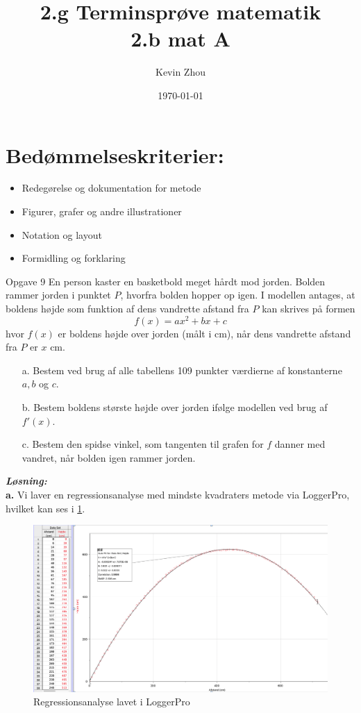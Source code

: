 \documentclass{article}
\title{2.g Terminsprøve matematik\\
{\Large \textbf{2.b mat A}}}
\author{Kevin Zhou}
\date{\today}
\newcommand{\sol}{\setlength{\parindent}{0cm}\textbf{\textit{Løsning:}}\setlength{\parindent}{1cm}}
\begin{document}
\maketitle
\section*{Bedømmelseskriterier:}
\begin{itemize}
    \setlength\itemsep{3cm}
    \Large
    \item  Redegørelse og dokumentation for metode
    \item Figurer, grafer og andre illustrationer
    \item Notation og layout
    \item Formidling og forklaring
\end{itemize}
\pagebreak
\begin{question}{Opgave 9}{}
  En person kaster en basketbold meget hårdt mod jorden. 
  Bolden rammer jorden i punktet $P$, hvorfra bolden hopper op igen.
  I modellen antages, at boldens højde som funktion af dens vandrette afstand fra $P$ kan skrives på formen
  \[
  f(x)= ax^2+bx+c
  \] 
  hvor $f(x)$ er boldens højde over jorden (målt i cm), når dens vandrette afstand fra $P$ er $x$ cm. 
  \begin{itemize}
    \item[a.] Bestem ved brug af alle tabellens 109 punkter værdierne af konstanterne $a,b$ og $c$. 
    \item[b.] Bestem boldens største højde over jorden ifølge modellen ved brug af $f'(x)$.
    \item[c.] Bestem den spidse vinkel, som tangenten til grafen for $f$ danner med vandret, når bolden igen rammer jorden.
  \end{itemize}
\end{question}
\sol \\
\textbf{a.} Vi laver en regressionsanalyse med mindste kvadraters metode via LoggerPro, hvilket kan ses i \cref{fig:bold}.
\begin{figure}[H]
\begin{center}
  \includegraphics[width=\textwidth]{bold.png}
\end{center}
\caption{Regressionsanalyse lavet i LoggerPro}
\label{fig:bold}
\end{figure}
\end{document}
